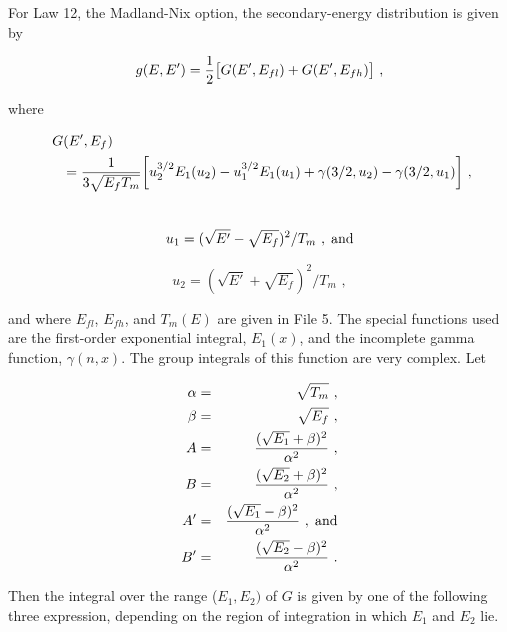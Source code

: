 For Law 12, the Madland-Nix option, the secondary-energy
distribution is given by

  \begin{equation}
    g(E,E')={1 \over 2} \bigl[ G(E',E_{fl})+G(E',E_{fh}) \bigr]\,\,,
  \end{equation}

\noindent
where

  \begin{eqnarray}
    \lefteqn{G(E',E_f)}\nonumber\\
    & & ={{1}\over {3\sqrt{E_fT_m}}}
    \biggl[ u_2^{3/2}E_1(u_2)-u_1^{3/2}E_1(u_1)
    +\gamma (3/2,u_2)-\gamma (3/2,u_1) \biggr]\,\,,\nonumber\\
    \mbox{ }
  \end{eqnarray}

  \begin{equation}
    u_1=(\sqrt{E'}-\sqrt{E_f})^2 / T_m\,\,,\;\hbox{and}
  \end{equation}

  \begin{equation}
    u_2=(\sqrt{E'}+\sqrt{E_f})^2 / T_m\,\,,
  \end{equation}

\noindent
and where $E_{fl}$, $E_{fh}$, and $T_m(E)$ are given in File 5.
The special functions used are the first-order exponential integral,
$E_1(x)$, and the incomplete gamma function, $\gamma (n,x)$.
The group integrals of this function are very complex\cite{ref14}.  Let

  \begin{eqnarray}
    \alpha &=& \sqrt{T_m}\,\,,\\
    \beta &=& \sqrt{E_f}\,\,,\\
    A&=& {{(\sqrt{E_1}+\beta )^2} \over {\alpha^2}}\,\,,\\
    B&=& {{(\sqrt{E_2}+\beta )^2} \over {\alpha^2}}\,\,,\\
    A'&=& {{(\sqrt{E_1}-\beta )^2} \over {\alpha^2}}\,\,,\;\hbox{and}\\
    B'&=& {{(\sqrt{E_2}-\beta )^2} \over {\alpha^2}}\,\,.
  \end{eqnarray}

\noindent
Then the integral over the range ($E_1,E_2)$ of $G$ is given by one of the
following three expression, depending on the region of integration
in which $E_1$ and $E_2$ lie.

